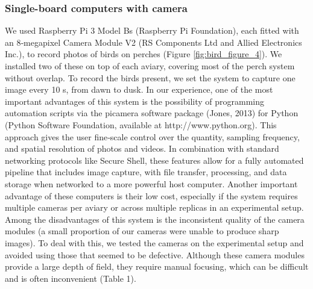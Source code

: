 \documentclass[11pt,a4paper,twoside]{book}
\begin{document}
\begin{doublespace}
\subsubsection{Single-board computers with camera}
We used Raspberry Pi 3 Model Bs (Raspberry Pi Foundation), each fitted with an 8‐megapixel Camera Module V2 (RS Components Ltd and Allied Electronics Inc.), to record photos of birds on perches (Figure \ref{fig:bird_figure_4}). We installed two of these on top of each aviary, covering most of the perch system without overlap. To record the birds present, we set the system to capture one image every 10 s, from dawn to dusk. In our experience, one of the most important advantages of this system is the possibility of programming automation scripts via the picamera software package (Jones, 2013) for Python (Python Software Foundation, available at http://www.python.org). This approach gives the user fine‐scale control over the quantity, sampling frequency, and spatial resolution of photos and videos. In combination with standard networking protocols like Secure Shell, these features allow for a fully automated pipeline that includes image capture, with file transfer, processing, and data storage when networked to a more powerful host computer. Another important advantage of these computers is their low cost, especially if the system requires multiple cameras per aviary or across multiple replicas in an experimental setup. Among the disadvantages of this system is the inconsistent quality of the camera modules (a small proportion of our cameras were unable to produce sharp images). To deal with this, we tested the cameras on the experimental setup and avoided using those that seemed to be defective. Although these camera modules provide a large depth of field, they require manual focusing, which can be difficult and is often inconvenient (Table 1).


\end{doublespace}
\end{document}
